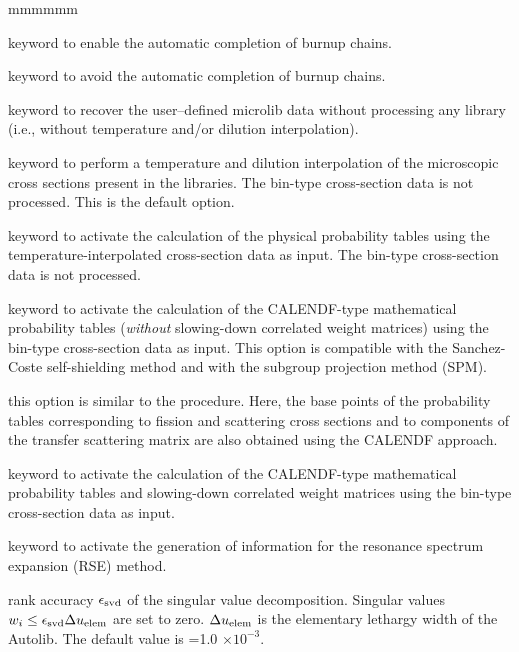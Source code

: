 \begin{ListeDeDescription}{mmmmmm}
\item[\moc{CDEPCHN}] keyword to enable the automatic completion of burnup chains.

\item[\moc{DDEPCHN}] keyword to avoid the automatic completion of burnup chains.

\item[\moc{SKIP}] keyword to recover the user--defined microlib data without processing
any library (i.e., without temperature and/or dilution interpolation).

\item[\moc{INTR}] keyword to perform a temperature and dilution interpolation
of the microscopic cross sections present in the libraries. The bin-type
cross-section data is not processed. This is the default option.

\item[\moc{SUBG}] keyword to activate the calculation of the physical probability
tables using the tempera\-tu\-re-interpolated cross-section data as
input.\cite{subg,nse2004} The bin-type cross-section data is not processed.

\item[\moc{PT}] keyword to activate the calculation of the CALENDF-type
mathematical probability tables ({\sl without} slowing-down correlated weight matrices)
using the bin-type cross-section data as input.\cite{pt} This option is
compatible with the Sanchez-Coste self-shielding method and with the subgroup projection method (SPM).\cite{SPM09}

\item[\moc{PTMC}] this option is similar to the  procedure. Here, the base points of the probability tables corresponding
to fission and scattering cross sections and to components of the transfer scattering matrix are also obtained using the CALENDF approach.

\item[\moc{PTSL}] keyword to activate the calculation of the CALENDF-type
mathematical probability tables and slowing-down correlated weight matrices
using the bin-type cross-section data as input.\cite{nse2004}

\item[\moc{RSE}] keyword to activate the generation of information for the resonance spectrum expansion (RSE) method.\cite{rse2021}

\item[\dusa{svdeps}] rank accuracy $\epsilon_{\rm svd}$ of the singular value decomposition. Singular values $w_i \le \epsilon_{\rm svd}\Delta u_{\rm elem}$ are set to zero.
$\Delta u_{\rm elem}$ is the elementary lethargy width of the Autolib. The default value is =1.0 $\times 10^{-3}$.


\end{ListeDeDescription}

